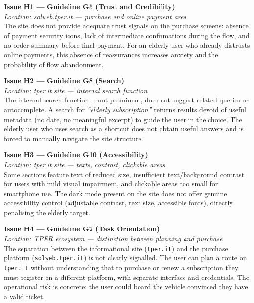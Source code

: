 ﻿\documentclass[11pt,a4paper]{article}
\begin{document}
\bigskip

\noindent\textbf{Issue H1 --- Guideline G5 (Trust and Credibility)}\label{iss:H1}\\
\textit{Location: solweb.tper.it --- purchase and online payment area}\\

\noindent The site does not provide adequate trust signals on the purchase screens: absence of payment security icons, lack of intermediate confirmations during the flow, and no order summary before final payment. For an elderly user who already distrusts online payments, this absence of reassurances increases anxiety and the probability of flow abandonment.

\bigskip

\noindent\textbf{Issue H2 --- Guideline G8 (Search)}\label{iss:H2}\\
\textit{Location: tper.it site --- internal search function}\\

\noindent The internal search function is not prominent, does not suggest related queries or autocomplete. A search for \textit{``elderly subscription''} returns results devoid of useful metadata (no date, no meaningful excerpt) to guide the user in the choice. The elderly user who uses search as a shortcut does not obtain useful answers and is forced to manually navigate the site structure.

\bigskip

\noindent\textbf{Issue H3 --- Guideline G10 (Accessibility)}\label{iss:H3}\\
\textit{Location: tper.it site --- texts, contrast, clickable areas}\\

\noindent Some sections feature text of reduced size, insufficient text/background contrast for users with mild visual impairment, and clickable areas too small for smartphone use. The dark mode present on the site does not offer genuine accessibility control (adjustable contrast, text size, accessible fonts), directly penalising the elderly target.

\bigskip

\noindent\textbf{Issue H4 --- Guideline G2 (Task Orientation)}\label{iss:H4}\\
\textit{Location: TPER ecosystem --- distinction between planning
and purchase}\\

\noindent The separation between the informational site (\texttt{tper.it}) and the
purchase platform (\texttt{solweb.tper.it}) is not clearly
signalled. The user can plan a route on \texttt{tper.it}
without understanding that to purchase or renew a subscription they
must register on a different platform, with separate interface and
credentials. The operational risk is concrete: the user could board
the vehicle convinced they have a valid ticket.
\end{document}
